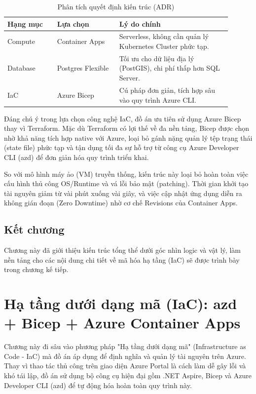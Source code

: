 \documentclass[a4paper,12pt,twoside]{report}
\begin{document}
\begin{table}[H]
    \centering
    \caption{Phân tích quyết định kiến trúc (ADR)}
    \label{tab:adr-analysis}
    \begin{tabular}{|p{0.2\linewidth}|p{0.25\linewidth}|p{0.45\linewidth}|}
        \hline
        \textbf{Hạng mục} & \textbf{Lựa chọn} & \textbf{Lý do chính} \\
        \hline
        Compute & Container Apps & Serverless, không cần quản lý Kubernetes Cluster phức tạp. \\
        \hline
        Database & Postgres Flexible & Tối ưu cho dữ liệu địa lý (PostGIS), chi phí thấp hơn SQL Server. \\
        \hline
        IaC & Azure Bicep & Cú pháp đơn giản, tích hợp sâu vào quy trình Azure CLI. \\
        \hline
    \end{tabular}
\end{table}

Đáng chú ý trong lựa chọn công nghệ IaC, đồ án ưu tiên sử dụng Azure Bicep thay vì Terraform. Mặc dù Terraform có lợi thế về đa nền tảng, Bicep được chọn nhờ khả năng tích hợp native với Azure, loại bỏ gánh nặng quản lý tệp trạng thái (state file) phức tạp và tận dụng tối đa sự hỗ trợ từ công cụ Azure Developer CLI (azd) để đơn giản hóa quy trình triển khai.

So với mô hình máy ảo (VM) truyền thống, kiến trúc này loại bỏ hoàn toàn việc cấu hình thủ công OS/Runtime và vá lỗi bảo mật (patching). Thời gian khởi tạo tài nguyên giảm từ vài phút xuống vài giây, và việc cập nhật ứng dụng diễn ra không gián đoạn (Zero Downtime) nhờ cơ chế Revisions của Container Apps.

\section*{Kết chương}
Chương này đã giới thiệu kiến trúc tổng thể dưới góc nhìn logic và vật lý, làm nền tảng cho các nội dung chi tiết về mã hóa hạ tầng (IaC) sẽ được trình bày trong chương kế tiếp.



\chapter{Hạ tầng dưới dạng mã (IaC): azd + Bicep + Azure Container Apps}

Chương này đi sâu vào phương pháp "Hạ tầng dưới dạng mã" (Infrastructure as Code - IaC) mà đồ án áp dụng để định nghĩa và quản lý tài nguyên trên Azure. Thay vì thao tác thủ công trên giao diện Azure Portal là cách làm dễ gây lỗi và khó tái lập, đồ án sử dụng bộ công cụ hiện đại gồm .NET Aspire, Bicep và Azure Developer CLI (azd) để tự động hóa hoàn toàn quy trình này.
\end{document}

